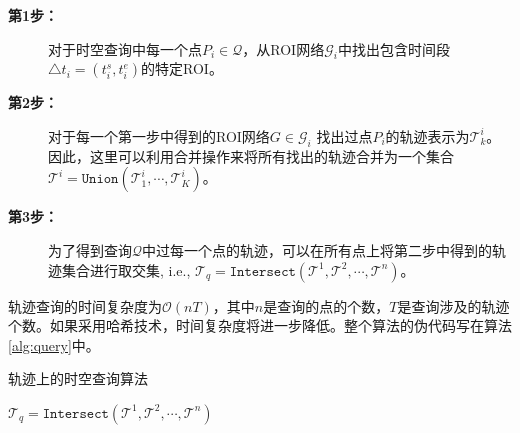 \begin{description}
\item[\textbf{第1步：}]对于时空查询中每一个点$P_i \in \mathcal{Q}$，从ROI网络$\mathcal{G}_i$中找出包含时间段$\triangle t_i = (t^s_i, t^e_i)$的特定ROI。
\vspace{1mm}

\item[\textbf{第2步：}]对于每一个第一步中得到的ROI网络$G \in \mathcal{G}_i$ 找出过点$P_i$的轨迹表示为$\mathcal{T}^i_k$。因此，这里可以利用合并操作来将所有找出的轨迹合并为一个集合$\mathcal{T}^i = \texttt{Union}(\mathcal{T}^i_1, \cdots, \mathcal{T}^i_K)$。
\vspace{1mm}

\item[\textbf{第3步：}]为了得到查询$\mathcal{Q}$中过每一个点的轨迹，可以在所有点上将第二步中得到的轨迹集合进行取交集, i.e., $\mathcal{T}_q = \texttt{Intersect}(\mathcal{T}^1, \mathcal{T}^2, \cdots, \mathcal{T}^n)$。
\end{description}

轨迹查询的时间复杂度为$\mathcal{O}(nT)$，其中$n$是查询的点的个数，$T$是查询涉及的轨迹个数。如果采用哈希技术，时间复杂度将进一步降低。整个算法的伪代码写在算法\ref{alg:query}中。


\begin{algorithm}[!t]
\caption{轨迹上的时空查询算法}
\label{alg:query}
\small{
\BlankLine
{}
$\mathcal{T}_q = \texttt{Intersect}(\mathcal{T}^1, \mathcal{T}^2, \cdots, \mathcal{T}^n)$\;
}
\end{algorithm}

